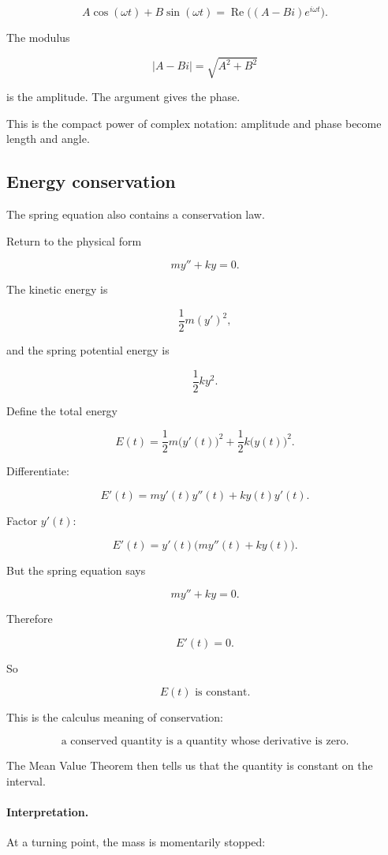 \[
A\cos(\omega t)+B\sin(\omega t)
=
\operatorname{Re}\bigl((A-Bi)e^{i\omega t}\bigr).
\]

The modulus

\[
|A-Bi|=\sqrt{A^2+B^2}
\]

is the amplitude.  The argument gives the phase.

This is the compact power of complex notation: amplitude and phase become length and
angle.

\subsection{Energy conservation}
\label{subsec:energy-conservation-spring}

The spring equation also contains a conservation law.

Return to the physical form

\[
my''+ky=0.
\]

The kinetic energy is

\[
\frac12m(y')^2,
\]

and the spring potential energy is

\[
\frac12ky^2.
\]

Define the total energy

\[
\boxed{
E(t)=\frac12m\bigl(y'(t)\bigr)^2+\frac12k\bigl(y(t)\bigr)^2.
}
\]

Differentiate:

\[
E'(t)
=
m y'(t)y''(t)+k y(t)y'(t).
\]

Factor \(y'(t)\):

\[
E'(t)
=
y'(t)\bigl(my''(t)+ky(t)\bigr).
\]

But the spring equation says

\[
my''+ky=0.
\]

Therefore

\[
\boxed{
E'(t)=0.
}
\]

So

\[
\boxed{
E(t)\text{ is constant.}
}
\]

This is the calculus meaning of conservation:

\[
\boxed{
\text{a conserved quantity is a quantity whose derivative is zero.}
}
\]

The Mean Value Theorem then tells us that the quantity is constant on the interval.

\paragraph{Interpretation.}
At a turning point, the mass is momentarily stopped:

